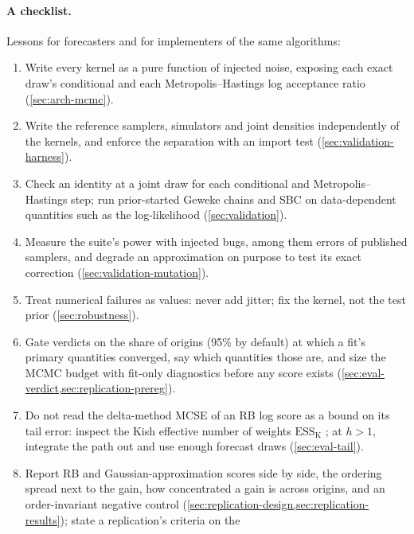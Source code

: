 \paragraph{A checklist.}
Lessons for forecasters and for implementers of the same algorithms:
\begin{enumerate}[leftmargin=*,itemsep=2pt,topsep=4pt]%
  \item Write every kernel as a pure function of injected noise, exposing each exact draw's
    conditional and each Metropolis--Hastings log acceptance ratio (\cref{sec:arch-mcmc}).
  \item Write the reference samplers, simulators and joint densities independently of the kernels,
    and enforce the separation with an import test (\cref{sec:validation-harness}).
  \item Check an identity at a joint draw for each conditional and Metropolis--Hastings step; run
    prior-started Geweke chains and SBC on data-dependent quantities such as the log-likelihood
    (\cref{sec:validation}).
  \item Measure the suite's power with injected bugs, among them errors of published samplers,
    and degrade an approximation on purpose to test its exact correction
    (\cref{sec:validation-mutation}).
  \item Treat numerical failures as values: never add jitter; fix the kernel, not the test prior
    (\cref{sec:robustness}).
  \item Gate verdicts on the share of origins (95\% by default) at which a fit's primary
    quantities converged, say which quantities those are, and size the MCMC budget with fit-only
    diagnostics before any score exists (\cref{sec:eval-verdict,sec:replication-prereg}).
  \item Do not read the delta-method MCSE of an RB log score as a bound on its tail error: inspect
    the Kish effective number of weights $\mathrm{ESS}_{\mathrm{K}}$ \citep{kish1965survey}; at
    $h > 1$, integrate the path out and use enough forecast draws (\cref{sec:eval-tail}).
  \item Report RB and Gaussian-approximation scores side by side, the ordering spread next to the
    gain, how concentrated a gain is across origins, and an order-invariant negative control
    (\cref{sec:replication-design,sec:replication-results}); state a replication's criteria on the

\end{enumerate}
